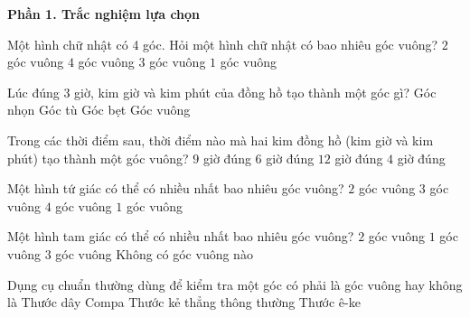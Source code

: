 \textbf{Phần 1. Trắc nghiệm lựa chọn}

\begin{ex} %
Một hình chữ nhật có 4 góc. Hỏi một hình chữ nhật có bao nhiêu góc vuông?
\choice
{$2$ góc vuông}
{\True $4$ góc vuông}
{$3$ góc vuông}
{$1$ góc vuông}
\end{ex}

\begin{ex} %
Lúc đúng $3$ giờ, kim giờ và kim phút của đồng hồ tạo thành một góc gì?
\choice
{Góc nhọn}
{Góc tù}
{Góc bẹt}
{\True Góc vuông}
\end{ex}

\begin{ex} %
Trong các thời điểm sau, thời điểm nào mà hai kim đồng hồ (kim giờ và kim phút) tạo thành một góc vuông?
\choice
{\True $9$ giờ đúng}
{$6$ giờ đúng}
{$12$ giờ đúng}
{$4$ giờ đúng}
\end{ex}

\begin{ex} %
Một hình tứ giác có thể có nhiều nhất bao nhiêu góc vuông?
\choice
{$2$ góc vuông}
{$3$ góc vuông}
{\True $4$ góc vuông}
{$1$ góc vuông}
\end{ex}

\begin{ex} %
Một hình tam giác có thể có nhiều nhất bao nhiêu góc vuông?
\choice
{$2$ góc vuông}
{\True $1$ góc vuông}
{$3$ góc vuông}
{Không có góc vuông nào}
\end{ex}

\begin{ex} %
Dụng cụ chuẩn thường dùng để kiểm tra một góc có phải là góc vuông hay không là
\choice
{Thước dây}
{Compa}
{Thước kẻ thẳng thông thường}
{\True Thước ê-ke}
\end{ex}

